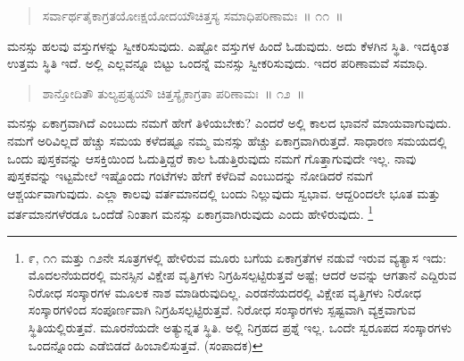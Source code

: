 \vspace{-0.2cm}

\begin{verse}
ಸರ್ವಾರ್ಥತೈಕಾಗ್ರತಯೋಃಕ್ಷಯೋದಯೌಚಿತ್ತಸ್ಯ ಸಮಾಧಿಪರಿಣಾಮಃ~॥ ೧೧~॥
\end{verse}

\vspace{-0.42cm}


\vspace{0.1cm}

ಮನಸ್ಸು ಹಲವು ವಸ್ತುಗಳನ್ನು ಸ್ವೀಕರಿಸುವುದು. ಎಷ್ಟೋ ವಸ್ತುಗಳ ಹಿಂದೆ ಓಡುವುದು. ಅದು ಕೆಳಗಿನ ಸ್ಥಿತಿ. ಇದಕ್ಕಿಂತ ಉತ್ತಮ ಸ್ಥಿತಿ ಇದೆ. ಅಲ್ಲಿ ಎಲ್ಲವನ್ನೂ ಬಿಟ್ಟು ಒಂದನ್ನೆ ಮನಸ್ಸು ಸ್ವೀಕರಿಸುವುದು. ಇದರ ಪರಿಣಾಮವೆ ಸಮಾಧಿ. 

\vspace{-0.2cm}

\begin{verse}
ಶಾನ್ತೋದಿತೌ ತುಲ್ಯಪ್ರತ್ಯಯೌ ಚಿತ್ತಸ್ಯೈಕಾಗ್ರತಾ ಪರಿಣಾಮಃ~॥ ೧೨~॥
\end{verse}

\vspace{-0.42cm}


\vspace{0.2cm}

ಮನಸ್ಸು ಏಕಾಗ್ರವಾಗಿದೆ ಎಂಬುದು ನಮಗೆ ಹೇಗೆ ತಿಳಿಯಬೇಕು? ಎಂದರೆ ಅಲ್ಲಿ ಕಾಲದ ಭಾವನೆ ಮಾಯವಾಗುವುದು. ನಮಗೆ ಅರಿವಿಲ್ಲದೆ ಹೆಚ್ಚು ಸಮಯ ಕಳೆದಷ್ಟೂ ನಮ್ಮ ಮನಸ್ಸು ಹೆಚ್ಚು ಏಕಾಗ್ರವಾಗಿರುತ್ತದೆ. ಸಾಧಾರಣ ಸಮಯದಲ್ಲಿ ಒಂದು ಪುಸ್ತಕವನ್ನು ಆಸಕ್ತಿಯಿಂದ ಓದುತ್ತಿದ್ದರೆ ಕಾಲ ಓಡುತ್ತಿರುವುದು ನಮಗೆ ಗೊತ್ತಾಗುವುದೇ ಇಲ್ಲ. ನಾವು ಪುಸ್ತಕವನ್ನು ಇಟ್ಟಮೇಲೆ ಇಷ್ಟೊಂದು ಗಂಟೆಗಳು ಹೇಗೆ ಕಳೆದಿವೆ ಎಂಬುದನ್ನು ನೋಡಿದರೆ ನಮಗೆ ಆಶ್ಚರ್ಯವಾಗುವುದು. ಎಲ್ಲಾ ಕಾಲವು ವರ್ತಮಾನದಲ್ಲಿ ಬಂದು ನಿಲ್ಲುವುದು ಸ್ವಭಾವ. ಆದ್ದರಿಂದಲೇ ಭೂತ ಮತ್ತು ವರ್ತಮಾನಗಳೆರಡೂ ಒಂದೆಡೆ ನಿಂತಾಗ ಮನಸ್ಸು ಏಕಾಗ್ರವಾಗಿರುವುದು ಎಂದು ಹೇಳಿರುವುದು. \footnote{೯, ೧೧ ಮತ್ತು ೧೨ನೇ ಸೂತ್ರಗಳಲ್ಲಿ ಹೇಳಿರುವ ಮೂರು ಬಗೆಯ ಏಕಾಗ್ರತೆಗಳ ನಡುವೆ ಇರುವ ವ್ಯತ್ಯಾಸ ಇದು: ಮೊದಲನೆಯದರಲ್ಲಿ ಮನಸ್ಸಿನ ವಿಕ್ಷೇಪ ವೃತ್ತಿಗಳು ನಿಗ್ರಹಿಸಲ್ಪಟ್ಟಿರುತ್ತವೆ ಅಷ್ಟೆ; ಆದರೆ ಅವನ್ನು ಆಗತಾನೆ ಎದ್ದಿರುವ ನಿರೋಧ ಸಂಸ್ಕಾರಗಳ ಮೂಲಕ ನಾಶ ಮಾಡಿರುವುದಿಲ್ಲ. ಎರಡನೆಯದರಲ್ಲಿ ವಿಕ್ಷೇಪ ವೃತ್ತಿಗಳು ನಿರೋಧ ಸಂಸ್ಕಾರಗಳಿಂದ ಸಂಪೂರ್ಣವಾಗಿ ನಿಗ್ರಹಿಸಲ್ಪಟ್ಟಿರುತ್ತವೆ. ನಿರೋಧ ಸಂಸ್ಕಾರಗಳು ಸ್ಪಷ್ಟವಾಗಿ ವ್ಯಕ್ತವಾಗುವ ಸ್ಥಿತಿಯಲ್ಲಿರುತ್ತವೆ. ಮೂರನೆಯದೇ ಅತ್ಯುನ್ನತ ಸ್ಥಿತಿ. ಅಲ್ಲಿ ನಿಗ್ರಹದ ಪ್ರಶ್ನೆ ಇಲ್ಲ. ಒಂದೇ ಸ್ವರೂಪದ ಸಂಸ್ಕಾರಗಳು ಒಂದನ್ನೊಂದು ಎಡೆಬಿಡದೆ ಹಿಂಬಾಲಿಸುತ್ತವೆ. (ಸಂಪಾದಕ)}

\vspace{-0.3cm}

